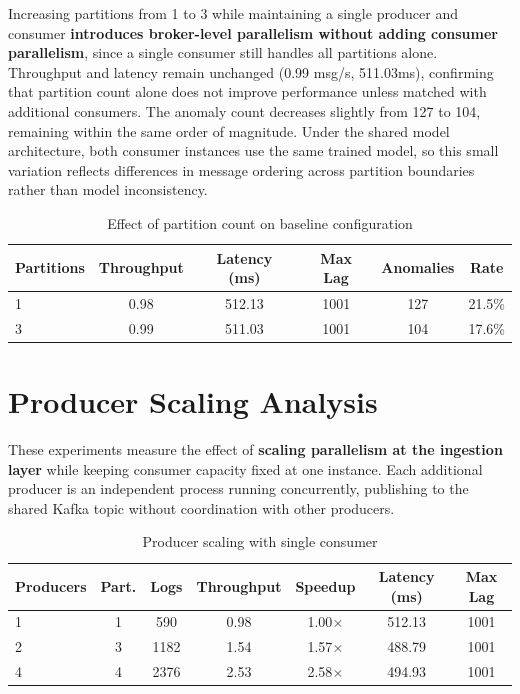 \documentclass[12pt,a4paper]{report}
\begin{document}
Increasing partitions from 1 to 3 while maintaining a single producer and consumer
\textbf{introduces broker-level parallelism without adding consumer parallelism}, since a
single consumer still handles all partitions alone. Throughput and latency remain
unchanged (0.99 msg/s, 511.03ms), confirming that partition count alone does not improve
performance unless matched with additional consumers. The anomaly count decreases slightly
from 127 to 104, remaining within the same order of magnitude. Under the shared model
architecture, both consumer instances use the same trained model, so this small variation
reflects differences in message ordering across partition boundaries rather than model
inconsistency.

\begin{table}[htbp]
\centering
\small
\caption{Effect of partition count on baseline configuration}
\label{tab:partition-effect}
\begin{tabular}{@{}lccccc@{}}
\hline
\textbf{Partitions} & \textbf{Throughput} & \textbf{Latency (ms)} & \textbf{Max Lag} &
\textbf{Anomalies} & \textbf{Rate} \\
\hline
1 & 0.98 & 512.13 & 1001 & 127 & 21.5\% \\
3 & 0.99 & 511.03 & 1001 & 104 & 17.6\% \\
\hline
\end{tabular}
\end{table}

\section{Producer Scaling Analysis}

These experiments measure the effect of \textbf{scaling parallelism at the ingestion layer}
while keeping consumer capacity fixed at one instance. Each additional producer is an
independent process running concurrently, publishing to the shared Kafka topic without
coordination with other producers.

\begin{table}[htbp]
\centering
\small
\caption{Producer scaling with single consumer}
\label{tab:producer-scaling}
\begin{tabular}{@{}lcccccc@{}}
\hline
\textbf{Producers} & \textbf{Part.} & \textbf{Logs} & \textbf{Throughput} &
\textbf{Speedup} & \textbf{Latency (ms)} & \textbf{Max Lag} \\
\hline
1 & 1 & 590  & 0.98 & 1.00$\times$ & 512.13 & 1001 \\
2 & 3 & 1182 & 1.54 & 1.57$\times$ & 488.79 & 1001 \\
4 & 4 & 2376 & 2.53 & 2.58$\times$ & 494.93 & 1001 \\
\hline
\end{tabular}
\end{table}
\end{document}
